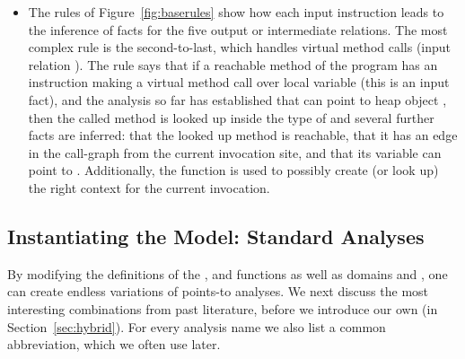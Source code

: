 \begin{itemize}
\item The rules of Figure~\ref{fig:baserules} show how each input
  instruction leads to the inference of facts for the five output or
  intermediate relations. The most complex rule is the second-to-last,
  which handles virtual method calls (input relation
  ). The rule says that if a reachable method of the
  program has an instruction making a virtual method call over local
  variable  (this is an input fact), and the analysis so
  far has established that  can point to heap object
  , then the called method is looked up inside the type of
   and several further facts are inferred: that the looked
  up method is reachable, that it has an edge in the call-graph from
  the current invocation site, and that its  variable can
  point to . Additionally, the  function is
  used to possibly create (or look up) the right context for the
  current invocation.





\end{itemize}


\subsection{Instantiating the Model: Standard Analyses}
\label{sec:instances}

By modifying the definitions of the ,
 and  functions as well as
domains  and , one can create endless variations of
points-to analyses. We next discuss the most interesting combinations
from past literature, before we introduce our own (in
Section~\ref{sec:hybrid}).  For every analysis name we also list a
common abbreviation, which we often use later.

